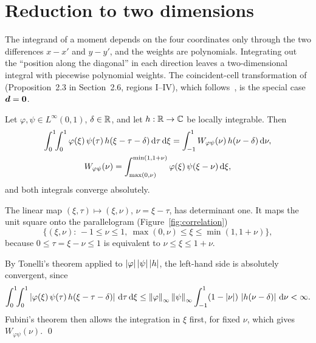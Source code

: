 \section{Reduction to two dimensions}
\label{sec:reduction}

The integrand of a moment depends on the four coordinates only through the two differences $x-x'$ and $y-y'$, and the
weights are polynomials. Integrating out the ``position along the diagonal'' in each direction leaves a two-dimensional
integral with piecewise polynomial weights. The coincident-cell transformation of~\cite{machacek2025method}
(Proposition~2.3 in Section~2.6, regions I--IV), which follows~\cite{Bao2020}, is the special case $\vb*{d}=\vb*{0}$.

 Let $\varphi,\psi\in L^\infty(0,1)$, $\delta\in\mathbb{R}$, and let
$h:\mathbb{R}\to\mathbb{C}$ be locally integrable. Then
\begin{equation}
    \label{eq:correlation}
    \begin{gathered}
    \int_0^1\!\!\int_0^1 \varphi(\xi)\,\psi(\tau)\,h(\xi-\tau-\delta)\,\mathrm{d}\tau\,\mathrm{d}\xi
    = \int_{-1}^{1} W_{\varphi\psi}(\nu)\,h(\nu-\delta)\,\mathrm{d}\nu,\\
    W_{\varphi\psi}(\nu) = \int_{\max(0,\nu)}^{\min(1,1+\nu)} \varphi(\xi)\,\psi(\xi-\nu)\,\mathrm{d}\xi,
    \end{gathered}
\end{equation}
and both integrals converge absolutely.

\vspace{\baselineskip}
\proof The linear map $(\xi,\tau)\mapsto(\xi,\nu)$, $\nu=\xi-\tau$, has determinant one. It maps the unit square onto the parallelogram (Figure~\ref{fig:correlation})
\begin{equation}
    \{(\xi,\nu):\,-1\le\nu\le1,\ \max(0,\nu)\le\xi\le\min(1,1+\nu)\},
\end{equation}
because $0\le\tau=\xi-\nu\le1$ is equivalent to $\nu\le\xi\le1+\nu$.

By Tonelli's theorem applied to $\left| \varphi \right|\left| \psi \right|\left| h \right|$, the left-hand side is absolutely convergent, since
\begin{equation}
    \int_0^1\!\!\int_0^1 \left| \varphi(\xi)\,\psi(\tau)\,h(\xi-\tau-\delta) \right|\,\mathrm{d}\tau\,\mathrm{d}\xi
    \le \left\| \varphi \right\|_\infty\left\| \psi \right\|_\infty\int_{-1}^{1}(1-\left| \nu \right|)\,\left| h(\nu-\delta) \right|\,\mathrm{d}\nu < \infty .
\end{equation}
Fubini's theorem then allows the integration in $\xi$ first, for fixed $\nu$, which gives $W_{\varphi\psi}(\nu)$. \qed

